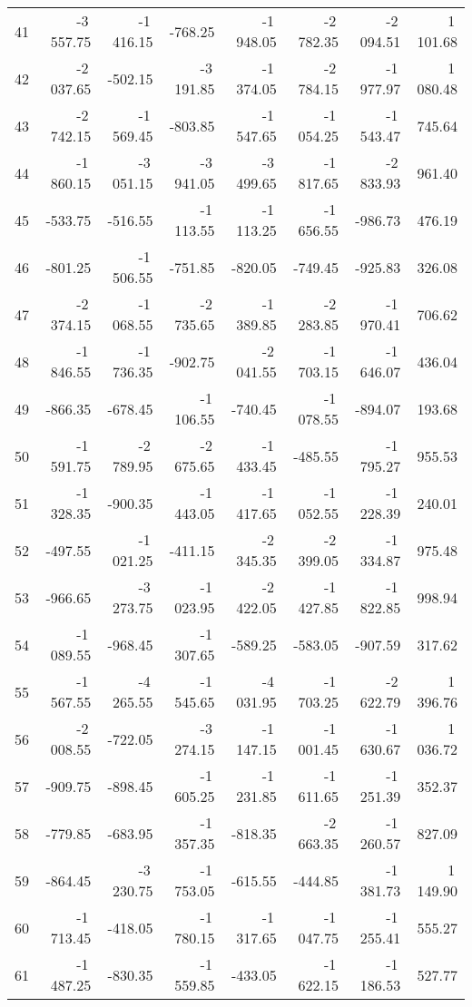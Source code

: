 \begin{longtable}{rrrrrrrr}
41 & -3\,557.75 & -1\,416.15 & -768.25 & -1\,948.05 & -2\,782.35 & -2\,094.51 & 1\,101.68  \\
42 & -2\,037.65 & -502.15 & -3\,191.85 & -1\,374.05 & -2\,784.15 & -1\,977.97 & 1\,080.48  \\
43 & -2\,742.15 & -1\,569.45 & -803.85 & -1\,547.65 & -1\,054.25 & -1\,543.47 & 745.64  \\
44 & -1\,860.15 & -3\,051.15 & -3\,941.05 & -3\,499.65 & -1\,817.65 & -2\,833.93 & 961.40  \\
45 & -533.75 & -516.55 & -1\,113.55 & -1\,113.25 & -1\,656.55 & -986.73 & 476.19  \\
46 & -801.25 & -1\,506.55 & -751.85 & -820.05 & -749.45 & -925.83 & 326.08  \\
47 & -2\,374.15 & -1\,068.55 & -2\,735.65 & -1\,389.85 & -2\,283.85 & -1\,970.41 & 706.62  \\
48 & -1\,846.55 & -1\,736.35 & -902.75 & -2\,041.55 & -1\,703.15 & -1\,646.07 & 436.04  \\
49 & -866.35 & -678.45 & -1\,106.55 & -740.45 & -1\,078.55 & -894.07 & 193.68  \\
50 & -1\,591.75 & -2\,789.95 & -2\,675.65 & -1\,433.45 & -485.55 & -1\,795.27 & 955.53  \\
51 & -1\,328.35 & -900.35 & -1\,443.05 & -1\,417.65 & -1\,052.55 & -1\,228.39 & 240.01  \\
52 & -497.55 & -1\,021.25 & -411.15 & -2\,345.35 & -2\,399.05 & -1\,334.87 & 975.48  \\
53 & -966.65 & -3\,273.75 & -1\,023.95 & -2\,422.05 & -1\,427.85 & -1\,822.85 & 998.94  \\
54 & -1\,089.55 & -968.45 & -1\,307.65 & -589.25 & -583.05 & -907.59 & 317.62  \\
55 & -1\,567.55 & -4\,265.55 & -1\,545.65 & -4\,031.95 & -1\,703.25 & -2\,622.79 & 1\,396.76  \\
56 & -2\,008.55 & -722.05 & -3\,274.15 & -1\,147.15 & -1\,001.45 & -1\,630.67 & 1\,036.72  \\
57 & -909.75 & -898.45 & -1\,605.25 & -1\,231.85 & -1\,611.65 & -1\,251.39 & 352.37  \\
58 & -779.85 & -683.95 & -1\,357.35 & -818.35 & -2\,663.35 & -1\,260.57 & 827.09  \\
59 & -864.45 & -3\,230.75 & -1\,753.05 & -615.55 & -444.85 & -1\,381.73 & 1\,149.90  \\
60 & -1\,713.45 & -418.05 & -1\,780.15 & -1\,317.65 & -1\,047.75 & -1\,255.41 & 555.27  \\
61 & -1\,487.25 & -830.35 & -1\,559.85 & -433.05 & -1\,622.15 & -1\,186.53 & 527.77  \\

\end{longtable}
